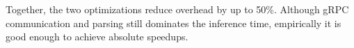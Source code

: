 Together, the two optimizations reduce overhead by up to 50\%. Although gRPC
communication and parsing still dominates the inference time, empirically it is
good enough to achieve absolute speedups. 



